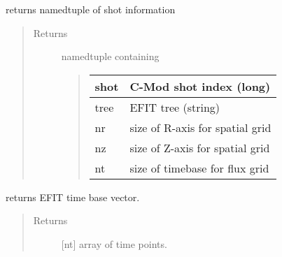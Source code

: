 \documentclass[letterpaper,10pt,english]{sphinxmanual}
\begin{document}
\begin{fulllineitems}
\begin{quote}
\begin{description}
\begin{itemize}
\end{itemize}

\end{description}\end{quote}

\begin{fulllineitems}
\label{\detokenize{eqtools:eqtools.EFIT.EFITTree.getInfo}}
returns namedtuple of shot information
\begin{quote}\begin{description}
\item[{Returns}] \leavevmode

namedtuple containing
\begin{quote}


\begin{savenotes}\sphinxattablestart
\centering
\begin{tabulary}{\linewidth}[t]{|T|T|}
\hline

shot
&
C-Mod shot index (long)
\\
\hline
tree
&
EFIT tree (string)
\\
\hline
nr
&
size of R-axis for spatial grid
\\
\hline
nz
&
size of Z-axis for spatial grid
\\
\hline
nt
&
size of timebase for flux grid
\\
\hline
\end{tabulary}
\par
\sphinxattableend\end{savenotes}
\end{quote}


\end{description}\end{quote}

\end{fulllineitems}


\begin{fulllineitems}
\label{\detokenize{eqtools:eqtools.EFIT.EFITTree.getTimeBase}}
returns EFIT time base vector.
\begin{quote}\begin{description}
\item[{Returns}] \leavevmode
{[}nt{]} array of time points.


\end{description}
\end{quote}
\end{fulllineitems}
\end{fulllineitems}
\end{document}
